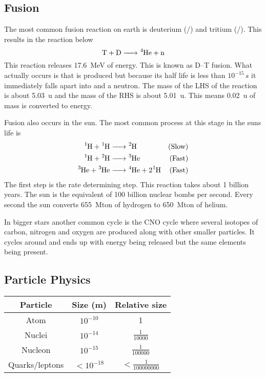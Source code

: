 \subsection*{Fusion}

The most common fusion reaction on earth is deuterium (/) and tritium (/). This results in the reaction below
\[\mathrm{T+D}\ce{->^4He}+\neutron\]
This reaction releases \SI{17.6}{MeV} of energy. This is known as D--T fusion.  What actually occurs is that  is produced but because its half life is less than \(10^{-15}\,\si{s}\) it immediately falls apart into  and a neutron. The mass of the LHS of the reaction is about \SI{5.03}{u} and the mass of the RHS is about \SI{5.01}{u}. This means \SI{0.02}{u} of mass is converted to energy.

Fusion also occurs in the sun. The most common process at this stage in the suns life is
\begin{align*}
\ce{^1H}+\ce{^1H}&\ce{->}\ce{^2H} & (\text{Slow})\\
\ce{^1H}+\ce{^2H}&\ce{->}\ce{^3He} & (\text{Fast})\\
\ce{^3He}+\ce{^3He}&\ce{->}\ce{^4He}+2\ce{^1H} & (\text{Fast})
\end{align*}
The first step is the rate determining step. This reaction takes about 1 billion years. The sun is the equivalent of 100 billion nuclear bombs per second. Every second the sun converts \SI{655}{Mton} of hydrogen to \SI{650}{Mton} of helium.

In bigger stars another common cycle is the CNO cycle where several isotopes of carbon, nitrogen and oxygen are produced along with other smaller particles. It cycles around and ends up with energy being released but the same elements being present.

\subsection*{Particle Physics}

\begin{center}
\begin{tabular}{ccc}\hline
Particle & Size (\si{m}) & Relative size\\\hline
Atom & \(10^{-10}\) & 1\\[0.2em]
Nuclei & \(10^{-14}\) & \(\frac{1}{10000}\)\\[0.2em]
Nucleon & \(10^{-15}\) & \(\frac{1}{100000}\)\\[0.2em]
Quarks/leptons & \(<10^{-18}\) & \(<\frac{1}{100000000}\)\\\hline
\end{tabular}
\end{center}

